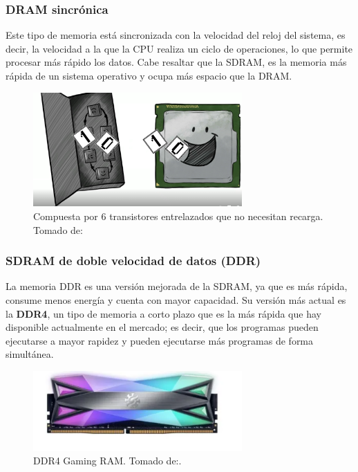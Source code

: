\documentclass{article}
\begin{document}
\subsubsection{DRAM sincrónica}
Este tipo de memoria está sincronizada con la velocidad del reloj del sistema, es decir, la velocidad a la que la CPU realiza un ciclo de operaciones, lo que permite procesar más rápido los datos. Cabe resaltar que la SDRAM, es la memoria más rápida de un sistema operativo y ocupa más espacio que la DRAM.
\begin{figure}[h]
\includegraphics[width=8cm]{SDRAm.PNG}
\centering
\caption{Compuesta por 6 transistores entrelazados que no necesitan recarga. \centering Tomado de:\cite{TEDwebsite}}
\label{SDRAm.PNG}
\end{figure}
\subsubsection{SDRAM de doble velocidad de datos (DDR)}
La memoria DDR es una versión mejorada de la SDRAM, ya que es más rápida, consume menos energía y cuenta con mayor capacidad. Su versión más actual es la \textbf{DDR4}, un tipo de memoria a corto plazo que es la más rápida que hay disponible actualmente en el mercado; es decir, que los programas pueden ejecutarse a mayor rapidez y pueden ejecutarse más programas de forma simultánea.
\vspace{0.2cm}
\begin{figure}[h]
\includegraphics[width=8cm]{DDR4.PNG}
\centering
\caption{DDR4 Gaming RAM. Tomado de:\cite{mercadolibre}. }
\label{DDR4.PNG}
\end{figure}
\newpage
\end{document}
